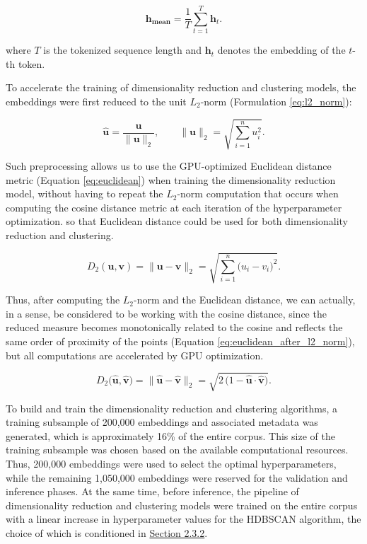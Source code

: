 \begin{equation}\label{eq:mean_pooling}
    \mathbf{h_{mean}}=\frac{1}{T}\sum^T_{t=1}\mathbf{h}_{t}.
\end{equation}

where $T$ is the tokenized sequence length and $\mathbf{h}_t$ denotes the embedding of the $t$-th token.

To accelerate the training of dimensionality reduction and clustering models, the embeddings were
first reduced to the unit $L_2$-norm (Formulation \ref{eq:l2_norm}):

\begin{equation}\label{eq:l2_norm}
    \widehat{\mathbf{u}}
    = \frac{\mathbf{u}}{\|\mathbf{u}\|_2},
    \qquad
    \|\mathbf{u}\|_2 = \sqrt{\sum_{i=1}^{n} u_i^2}.
\end{equation}

Such preprocessing allows us to use the GPU-optimized Euclidean distance metric (Equation \ref{eq:euclidean})
when training the dimensionality reduction model, without having to repeat the $L_2$-norm computation that
occurs when computing the cosine distance metric at each iteration of the hyperparameter optimization.
so that Euclidean distance could be used for both dimensionality reduction and clustering.

\begin{equation}\label{eq:euclidean}
    D_{2}(\mathbf{u}, \mathbf{v})
    = \|\mathbf{u} - \mathbf{v}\|_2
    = \sqrt{\sum_{i=1}^{n} \bigl(u_i - v_i\bigr)^2}.
\end{equation}

Thus, after computing the $L_2$-norm and the Euclidean distance, we can actually, in a sense, be considered
to be working with the cosine distance, since the reduced measure becomes monotonically related to the cosine
and reflects the same order of proximity of the points (Equation \ref{eq:euclidean_after_l2_norm}), but all
computations are accelerated by GPU optimization.

\begin{equation}\label{eq:euclidean_after_l2_norm}
    D_{2}\bigl(\widehat{\mathbf{u}}, \widehat{\mathbf{v}}\bigr)
    = \bigl\|\widehat{\mathbf{u}} - \widehat{\mathbf{v}}\bigr\|_2
    = \sqrt{2\,\bigl(1 - \widehat{\mathbf{u}}\!\cdot\!\widehat{\mathbf{v}}\bigr)}.
\end{equation}

To build and train the dimensionality reduction and clustering algorithms, a training subsample of 200,000 embeddings
and associated metadata was generated, which is approximately 16\% of the entire corpus. This size of the training
subsample was chosen based on the available computational resources. Thus, 200,000 embeddings were used to select
the optimal hyperparameters, while the remaining 1,050,000 embeddings were reserved for the validation and inference
phases. At the same time, before inference, the pipeline of dimensionality reduction and clustering models were trained
on the entire corpus with a linear increase in hyperparameter values for the HDBSCAN algorithm, the choice of which
is conditioned in \hyperref[sec:drc]{Section 2.3.2}.

